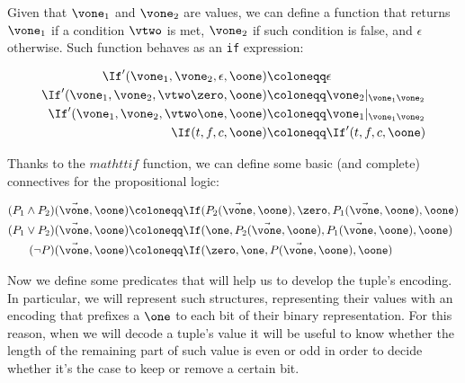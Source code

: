 Given that $\vone_1$ and $\vone_2$ are values, we can define a function that returns $\vone_1$ if a condition $\vtwo$ is met, $\vone_2$ if such condition is false, and $\epsilon$ otherwise. Such function behaves as an \texttt{if} expression:
\begin{defn} 

\begin{align*}
\If'(\vone_1, \vone_2, \epsilon, \oone)&\coloneqq \epsilon\\
\If'(\vone_1, \vone_2, \vtwo\zero, \oone)&\coloneqq \vone_2|_{\vone_1\vone_2}\\
\If'(\vone_1, \vone_2, \vtwo\one, \oone)&\coloneqq \vone_1|_{\vone_1\vone_2}\\
\If(t, f, c, \oone) &\coloneqq \If'(t, f, c, \oone)
\end{align*}

\end{defn}

\begin{defn}
Thanks to the $mathtt{if}$ function, we can define some basic (and complete) connectives for the propositional logic:

\begin{align*}
(P_1\land P_2)(\vec \vone, \oone) &\coloneqq \If(P_2(\vec \vone, \oone), \zero, P_1(\vec \vone, \oone), \oone)\\
(P_1\lor P_2)(\vec \vone, \oone) &\coloneqq \If(\one, P_2(\vec \vone, \oone), P_1(\vec \vone, \oone), \oone)\\
(\lnot P)(\vec \vone, \oone) &\coloneqq \If(\zero, \one, P(\vec \vone, \oone), \oone)
\end{align*}
\end{defn}

Now we define some predicates that will help us to develop the tuple's encoding. In particular, we will represent such structures, representing their values with an encoding that prefixes a $\one$ to each bit of their binary representation. For this reason, when we will decode a tuple's value it will be useful to know whether the length of the remaining part of such value is even or odd in order to decide whether it's the case to keep or remove a certain bit.

